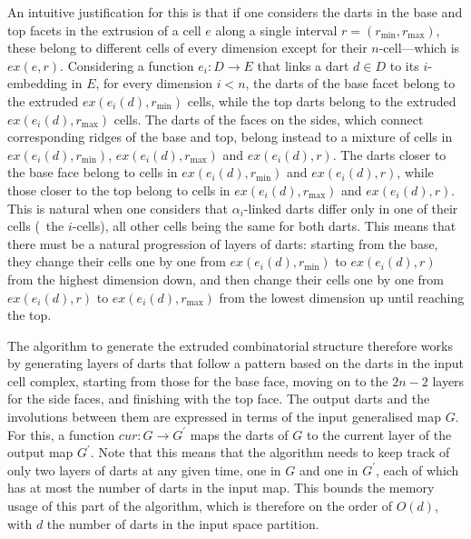 An intuitive justification for this is that if one considers the darts in the base and top facets in the extrusion of a cell $e$ along a single interval $r = (r_{\min}, r_{\max})$, these belong to different cells of every dimension except for their $n$-cell---which is $ex(e, r)$.
Considering a function $e_i: D \rightarrow E$ that links a dart $d \in D$ to its $i$-embedding in $E$, for every dimension $i < n$, the darts of the base facet belong to the extruded $ex\left(e_i\left(d\right), r_{\min}\right)$ cells, while the top darts belong to the extruded $ex\left(e_i\left(d\right), r_{\max}\right)$ cells.
The darts of the faces on the sides, which connect corresponding ridges of the base and top, belong instead to a mixture of cells in $ex\left(e_i\left(d\right), r_{\min}\right)$, $ex\left(e_i\left(d\right), r_{\max}\right)$ and $ex\left(e_i\left(d\right), r\right)$.
The darts closer to the base face belong to cells in $ex\left(e_i\left(d\right), r_{\min}\right)$ and $ex\left(e_i\left(d\right), r\right)$, while those closer to the top belong to cells in $ex\left(e_i\left(d\right), r_{\max}\right)$ and $ex\left(e_i\left(d\right), r\right)$.
This is natural when one considers that $\alpha_i$-linked darts differ only in one of their cells (\ie\ the $i$-cells), all other cells being the same for both darts.
This means that there must be a natural progression of layers of darts: starting from the base, they change their cells one by one from $ex\left(e_i\left(d\right), r_{\min}\right)$ to $ex\left(e_i\left(d\right), r\right)$ from the highest dimension down, and then change their cells one by one from $ex\left(e_i\left(d\right), r\right)$ to $ex\left(e_i\left(d\right), r_{\max}\right)$ from the lowest dimension up until reaching the top.

The algorithm to generate the extruded combinatorial structure therefore works by generating layers of darts that follow a pattern based on the darts in the input cell complex, starting from those for the base face, moving on to the $2n-2$ layers for the side faces, and finishing with the top face.
The output darts and the involutions between them are expressed in terms of the input generalised map $G$.
For this, a function $cur: G \rightarrow G^\prime$ maps the darts of $G$ to the current layer of the output map $G^\prime$.
Note that this means that the algorithm needs to keep track of only two layers of darts at any given time, one in $G$ and one in $G^\prime$, each of which has at most the number of darts in the input map.
This bounds the memory usage of this part of the algorithm, which is therefore on the order of $O(d)$, with $d$ the number of darts in the input space partition.

